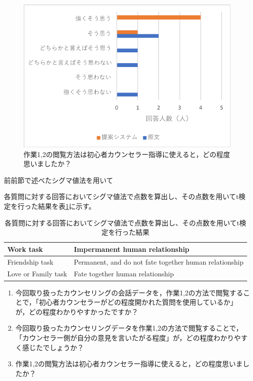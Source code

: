 \documentclass[shuuron]{kuee}
\begin{document}
\begin{figure}
  \begin{center}
     \includegraphics[width=\linewidth]{q3.png}
  \end{center}
  \caption{作業1,2の閲覧方法は初心者カウンセラー指導に使えると，どの程度思いましたか？}
  \label{fig:q3}
\end{figure}

前前節で述べたシグマ値法を用いて

各質問に対する回答においてシグマ値法で点数を算出し、その点数を用いてt検定を行った結果を表\ref{table:sigma}に示す。

\begin{table}
  \caption{各質問に対する回答においてシグマ値法で点数を算出し、その点数を用いてt検定を行った結果}
  \label{table:sigma}
  \begin{center}
    \begin{tabular}{|l|p{7cm}|} \hline
      Work task & Impermanent human relationship \\ \hline
      Friendship task  & Permanent, and do not fate together human relationship \\ \hline
      Love or Family task & Fate together human relationship \\ \hline

    \end{tabular}
  \end{center}
\end{table}




\begin{enumerate}

  \item 今回取り扱ったカウンセリングの会話データを，作業1,2の方法で閲覧することで，「初心者カウンセラーがどの程度開かれた質問を使用しているか」が，どの程度わかりやすかったですか？
  \item 今回取り扱ったカウンセリングデータを作業1,2の方法で閲覧することで，「カウンセラー側が自分の意見を言いたがる程度」が，どの程度わかりやすく感じたでしょうか？
  \item 作業1,2の閲覧方法は初心者カウンセラー指導に使えると，どの程度思いましたか？
\end{enumerate}
\end{document}
